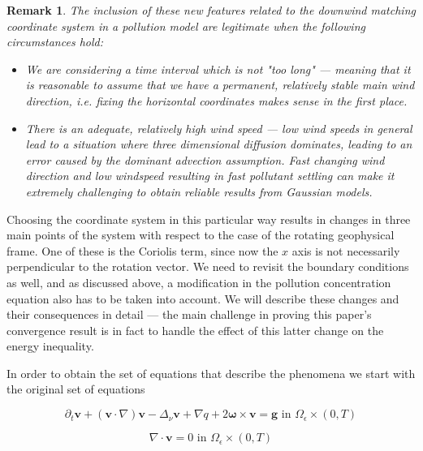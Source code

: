 \documentclass[11pt]{article}
\newtheorem{remark}{Remark}
\begin{document}
\begin{remark} \normalfont
  The inclusion of these new features related to the downwind matching coordinate system in a pollution model are legitimate when the following circumstances hold:
  \begin{itemize}
    \item We are considering a time interval which is not "too long" --- meaning that it is reasonable to assume that we have a permanent, relatively stable main wind direction, i.e. fixing the horizontal coordinates makes sense in the first place.
    \item There is an adequate, relatively high wind speed --- low wind speeds in general lead to a situation where three dimensional diffusion dominates, leading to an error caused by the dominant advection assumption. Fast changing wind direction and low windspeed resulting in fast pollutant settling can make it extremely challenging to obtain reliable results from Gaussian models.
  \end{itemize}
\end{remark}

Choosing the coordinate system in this particular way results in changes in three main points of the system with respect to the case of the rotating geophysical frame. One of these is the Coriolis term, since now the $x$ axis is not necessarily perpendicular to the rotation vector. We need to revisit the boundary conditions as well, and as discussed above, a modification in the pollution concentration equation also has to be taken into account. We will describe these changes and their consequences in detail --- the main challenge in proving this paper's convergence result is in fact to handle the effect of this latter change on the energy inequality.

In order to obtain the set of equations that describe the phenomena we start with the original set of equations

\begin{equation} \label{originalEQ-V}
  \partial_t \mathbf{v} + (\mathbf{v} \cdot \nabla)\mathbf{v} -\Delta_{\nu} \mathbf{v} + \nabla q + 2 \mathbf{\omega} \times \mathbf{v}= \mathbf{g} \text{ in } \Omega_{\epsilon} \times (0,T)
\end{equation}
    
\begin{equation} \label{originalEQ-I}
  \nabla \cdot \mathbf{v} = 0 \text{ in } \Omega_{\epsilon} \times (0,T)
\end{equation}
    
\end{document}
